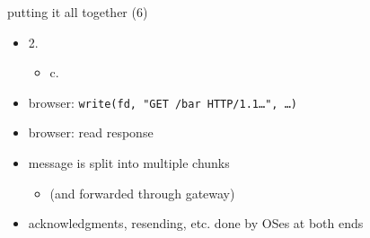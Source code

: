 \begin{frame}{putting it all together (6)}
    \begin{itemize}
    \item 2. 
        \begin{itemize}
        \item c. 
        \end{itemize}
    \vspace{.5cm}
    \item browser: \texttt{write(fd, "GET /bar HTTP/1.1\ldots", \ldots)}
    \item browser: read response
    \vspace{.5cm}
    \item message is split into multiple chunks
        \begin{itemize}
        \item (and forwarded through gateway)
        \end{itemize}
    \item acknowledgments, resending, etc. done by OSes at both ends
    \end{itemize}
\end{frame}

